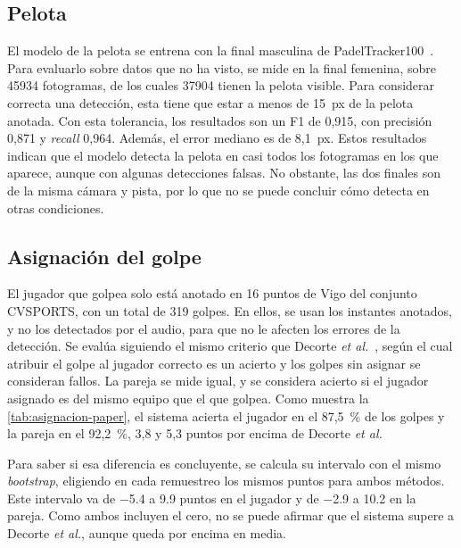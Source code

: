 \subsection{Pelota}
\label{sec:resultados-pelota}

El modelo de la pelota se entrena con la final masculina de PadelTracker100~\cite{badanerin2026padeltracker100}.
Para evaluarlo sobre datos que no ha visto, se mide en la final femenina, sobre \num{45934} fotogramas, de los cuales \num{37904} tienen la pelota visible.
Para considerar correcta una detección, esta tiene que estar a menos de 15~px de la pelota anotada.
Con esta tolerancia, los resultados son un F1 de 0,915, con precisión 0,871 y \textit{recall} 0,964.
Además, el error mediano es de 8,1~px.
Estos resultados indican que el modelo detecta la pelota en casi todos los fotogramas en los que aparece, aunque con algunas detecciones falsas.
No obstante, las dos finales son de la misma cámara y pista, por lo que no se puede concluir cómo detecta en otras condiciones.

\subsection{Asignación del golpe}
\label{sec:resultados-asignacion}

El jugador que golpea solo está anotado en 16 puntos de Vigo del conjunto CVSPORTS, con un total de 319 golpes.
En ellos, se usan los instantes anotados, y no los detectados por el audio, para que no le afecten los errores de la detección.
Se evalúa siguiendo el mismo criterio que Decorte \textit{et al.}~\cite{decorte2024padel}, según el cual atribuir el golpe al jugador correcto es un acierto y los golpes sin asignar se consideran fallos.
La pareja se mide igual, y se considera acierto si el jugador asignado es del mismo equipo que el que golpea.
Como muestra la \cref{tab:asignacion-paper}, el sistema acierta el jugador en el 87,5~\% de los golpes y la pareja en el 92,2~\%, 3,8 y 5,3 puntos por encima de Decorte \textit{et al.}

\begin{table}[htbp]
  \centering
  \caption{Acierto de la asignación del golpe frente a Decorte \textit{et al.}\ en los mismos 319 golpes.}
  \label{tab:asignacion-paper}
  
\end{table}

Para saber si esa diferencia es concluyente, se calcula su intervalo con el mismo \textit{bootstrap}, eligiendo en cada remuestreo los mismos puntos para ambos métodos.
Este intervalo va de \num{-5.4} a \num{9.9} puntos en el jugador y de \num{-2.9} a \num{10.2} en la pareja.
Como ambos incluyen el cero, no se puede afirmar que el sistema supere a Decorte \textit{et al.}, aunque queda por encima en media.

